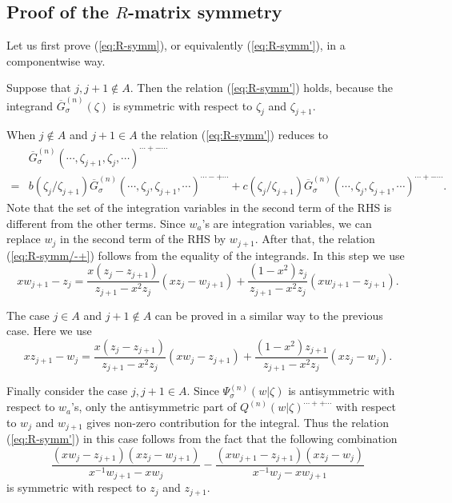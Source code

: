 \documentclass[a4paper,10pt]{article}
\begin{document}
\subsection{Proof of the $R$-matrix symmetry} 

Let us first prove (\ref{eq:R-symm}), or equivalently 
(\ref{eq:R-symm'}), in a componentwise way. 

Suppose that $j,j+1\not\in A$. Then the relation 
(\ref{eq:R-symm'}) holds, because the integrand 
$\overline{G}^{(n)}_\sigma (\zeta )$ is 
symmetric with respect to $\zeta_j$ and $\zeta_{j+1}$. 

When $j\not\in A$ and $j+1\in A$ the relation 
(\ref{eq:R-symm'}) reduces to 
\begin{equation}
\begin{array}{cl}
&\overline{G}_{\sigma}^{(n)} 
(\cdots,\zeta_{j+1},\zeta_j,\cdots)^{\cdots 
+- \cdots} \\
=&b(\zeta_j/\zeta_{j+1})
\overline{G}_{\sigma}^{(n)} 
(\cdots,\zeta_j,\zeta_{j+1},\cdots)^{\cdots 
-+ \cdots}+c(\zeta_j/\zeta_{j+1})
\overline{G}_{\sigma}^{(n)} 
(\cdots,\zeta_j,\zeta_{j+1},\cdots)^{\cdots 
+- \cdots}. 
\end{array}
\label{eq:R-symm/-+}
\end{equation}
Note that the set of the integration variables in 
the second term of the RHS is different from the 
other terms. Since $w_a$'s are integration variables, 
we can replace $w_{j}$ in the second term of the RHS 
by $w_{j+1}$. After that, the relation (\ref{eq:R-symm/-+}) 
follows from the equality of the integrands. In this step 
we use 
$$
xw_{j+1}-z_j =\frac{x(z_j -z_{j+1})}{z_{j+1}-x^2 z_j}
(xz_j -w_{j+1})+\frac{(1-x^2 )z_j}{z_{j+1}-x^2 z_j}
(xw_{j+1} -z_{j+1}). 
$$

The case $j\in A$ and $j+1\not\in A$ can be proved in 
a similar way to the previous case. Here we use 
$$
xz_{j+1}-w_j =\frac{x(z_j -z_{j+1})}{z_{j+1}-x^2 z_j}
(xw_j -z_{j+1})+\frac{(1-x^2 )z_{j+1}}{z_{j+1}-x^2 z_j}
(xz_{j} -w_{j}). 
$$

Finally consider the case $j, j+1\in A$. Since 
$\Psi^{(n)}_\sigma (w|\zeta )$ is antisymmetric 
with respect to $w_a$'s, only the antisymmetric part of 
$Q^{(n)}(w|\zeta )^{\cdots ++\cdots}$ with respect to 
$w_j$ and $w_{j+1}$ gives non-zero contribution for 
the integral. Thus the relation (\ref{eq:R-symm'}) 
in this case follows from the fact that the 
following combination 
$$
\frac{(xw_j -z_{j+1})(xz_j -w_{j+1})}
{x^{-1}w_{j+1}-xw_j}-
\frac{(xw_{j+1} -z_{j+1})(xz_j -w_{j})}
{x^{-1}w_{j}-xw_{j+1}}
$$
is symmetric with respect to $z_j$ and $z_{j+1}$. 
\end{document}
